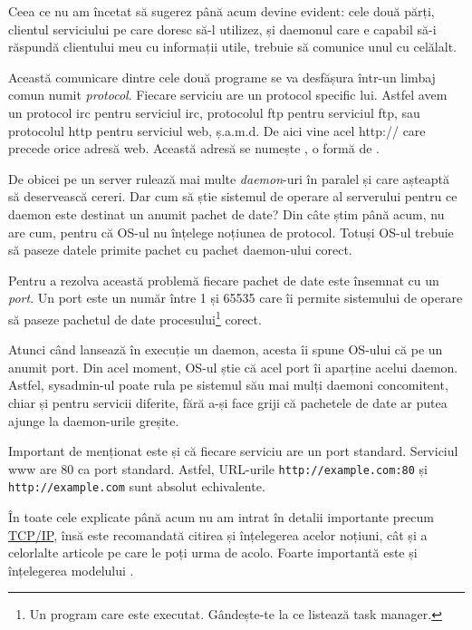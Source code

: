 Ceea ce nu am încetat să sugerez până acum devine evident: cele două părți, clientul
serviciului pe care doresc să-l utilizez, și daemonul care e capabil să-i răspundă
clientului meu cu informații utile, trebuie să comunice unul cu celălalt.

Această comunicare dintre cele două programe se va desfășura într-un limbaj comun numit
\textsl{protocol}. Fiecare serviciu are un protocol specific lui. Astfel avem un
protocol irc pentru serviciul irc, protocolul ftp pentru serviciul ftp,
sau protocolul http pentru serviciul web, ș.a.m.d. De aici vine acel {\glqq}http://{\grqq} care precede
orice adresă web. Această adresă se numește
,
o formă de .

De obicei pe un server rulează mai multe \textit{daemon}-uri în paralel și care
așteaptă să deservească cereri. Dar cum să știe sistemul de operare al serverului
pentru ce daemon este destinat un anumit pachet de date? Din câte știm până acum,
nu are cum, pentru că OS-ul nu înțelege noțiunea de {\glqq}protocol{\grqq}. Totuși OS-ul trebuie
să paseze datele primite pachet cu pachet daemon-ului corect.

Pentru a rezolva această problemă fiecare pachet de date este {\glqq}însemnat{\grqq} cu un \textsl{port}.
Un port este un număr între 1 și 65535 care îi permite sistemului de operare să
paseze pachetul de date procesului\footnote{Un program care este executat. Gândește-te
la ce listează {\glqq}task manager{\grqq}.} corect.

Atunci când  lansează în execuție un daemon,
acesta îi spune OS-ului că 
pe un anumit port. Din acel moment, OS-ul
{\glqq}știe{\grqq} că acel port îi {\glqq}aparține{\grqq} acelui daemon. Astfel, sysadmin-ul poate rula
pe sistemul său mai mulți daemoni concomitent, chiar și pentru servicii diferite, fără
a-și face griji că pachetele de date ar putea ajunge la daemon-urile greșite.

Important de menționat este și că fiecare serviciu are un port standard. Serviciul www
are 80 ca port standard. Astfel, URL-urile \texttt{http://example.com:80} și
\texttt{http://example.com} sunt absolut echivalente.

În toate cele explicate până acum nu am intrat în detalii importante precum
\href{http://en.wikipedia.org/wiki/Internet_Protocol_Suite}{TCP/IP}, însă este recomandată citirea și
înțelegerea acelor noțiuni, cât și a celorlalte articole pe care le poți urma de acolo.
Foarte importantă este și înțelegerea modelului
.


